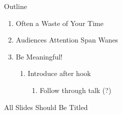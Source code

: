 \documentclass[aspectratio=169]{beamer}
\begin{document}
  \titleframe

  \begin{frame}{Outline}
    \begin{enumerate}
      \item Often a Waste of Your Time
      \item Audiences Attention Span Wanes
      \item Be Meaningful! \\[1mm]
      \begin{enumerate}
        \item Introduce after hook \\[2mm]
        \begin{enumerate}
          \item Follow through talk (?)
        \end{enumerate}
      \end{enumerate}
    \end{enumerate}
  \end{frame}
 
  \begin{frame}{All Slides Should Be Titled}
  \end{frame}
  
\end{document}
